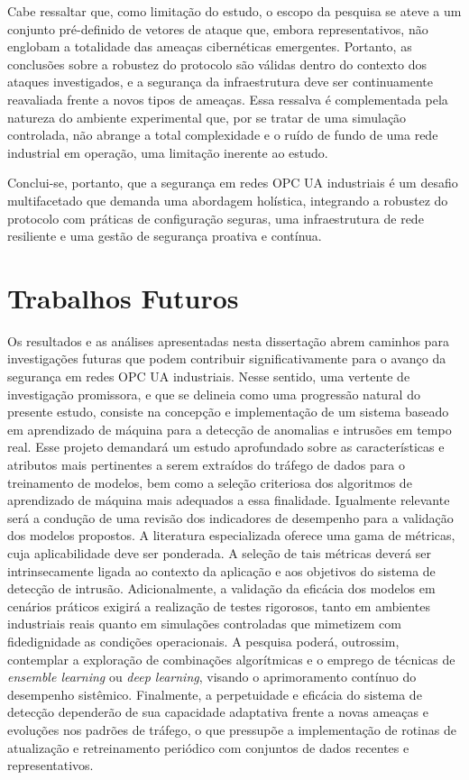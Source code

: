     Cabe ressaltar que, como limitação do estudo, o escopo da pesquisa se ateve a um conjunto pré-definido de vetores de ataque que, embora representativos, não englobam a totalidade das ameaças cibernéticas emergentes. Portanto, as conclusões sobre a robustez do protocolo são válidas dentro do contexto dos ataques investigados, e a segurança da infraestrutura deve ser continuamente reavaliada frente a novos tipos de ameaças. Essa ressalva é complementada pela natureza do ambiente experimental que, por se tratar de uma simulação controlada, não abrange a total complexidade e o ruído de fundo de uma rede industrial em operação, uma limitação inerente ao estudo.

    Conclui-se, portanto, que a segurança em redes OPC UA industriais é um desafio multifacetado que demanda uma abordagem holística, integrando a robustez do protocolo com práticas de configuração seguras, uma infraestrutura de rede resiliente e uma gestão de segurança proativa e contínua.

\section{Trabalhos Futuros}

    Os resultados e as análises apresentadas nesta dissertação abrem caminhos para investigações futuras que podem contribuir significativamente para o avanço da segurança em redes OPC UA industriais. Nesse sentido, uma vertente de investigação promissora, e que se delineia como uma progressão natural do presente estudo, consiste na concepção e implementação de um sistema baseado em aprendizado de máquina para a detecção de anomalias e intrusões em tempo real. Esse projeto demandará um estudo aprofundado sobre as características e atributos mais pertinentes a serem extraídos do tráfego de dados para o treinamento de modelos, bem como a seleção criteriosa dos algoritmos de aprendizado de máquina mais adequados a essa finalidade. Igualmente relevante será a condução de uma revisão dos indicadores de desempenho para a validação dos modelos propostos. A literatura especializada oferece uma gama de métricas, cuja aplicabilidade deve ser ponderada. A seleção de tais métricas deverá ser intrinsecamente ligada ao contexto da aplicação e aos objetivos do sistema de detecção de intrusão. Adicionalmente, a validação da eficácia dos modelos em cenários práticos exigirá a realização de testes rigorosos, tanto em ambientes industriais reais quanto em simulações controladas que mimetizem com fidedignidade as condições operacionais. A pesquisa poderá, outrossim, contemplar a exploração de combinações algorítmicas e o emprego de técnicas de \textit{ensemble learning} ou \textit{deep learning}, visando o aprimoramento contínuo do desempenho sistêmico. Finalmente, a perpetuidade e eficácia do sistema de detecção dependerão de sua capacidade adaptativa frente a novas ameaças e evoluções nos padrões de tráfego, o que pressupõe a implementação de rotinas de atualização e retreinamento periódico com conjuntos de dados recentes e representativos.
    
